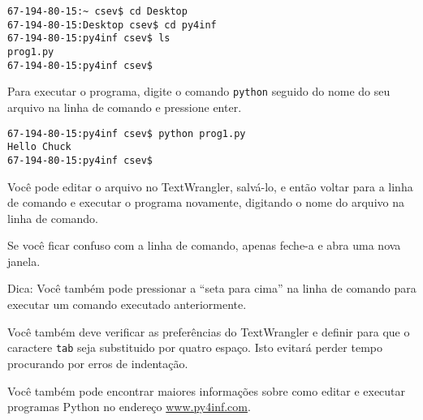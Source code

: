 \beforeverb
\begin{verbatim}
67-194-80-15:~ csev$ cd Desktop
67-194-80-15:Desktop csev$ cd py4inf
67-194-80-15:py4inf csev$ ls
prog1.py
67-194-80-15:py4inf csev$ 
\end{verbatim}
\afterverb
%
%
Para executar o programa, digite o comando {\tt python} seguido do nome do 
seu arquivo na linha de comando e pressione enter.

\beforeverb
\begin{verbatim}
67-194-80-15:py4inf csev$ python prog1.py
Hello Chuck
67-194-80-15:py4inf csev$ 
\end{verbatim}
\afterverb
%
%
Você pode editar o arquivo no TextWrangler, salvá-lo, e então voltar para 
a linha de comando e executar o programa novamente, digitando o nome do 
arquivo na linha de comando.


Se você ficar confuso com a linha de comando, apenas feche-a e abra uma nova 
janela.


Dica: Você também pode pressionar a ``seta para cima'' na linha de comando 
para executar um comando executado anteriormente.


Você também deve verificar as preferências do TextWrangler e definir para que 
o caractere {\tt tab} seja substituido por quatro espaço. Isto evitará 
perder tempo procurando por erros de indentação.


Você também pode encontrar maiores informações sobre como editar e executar 
programas Python no endereço \url{www.py4inf.com}.

